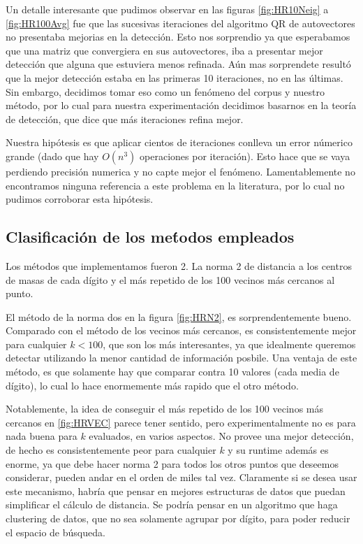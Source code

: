 Un detalle interesante que pudimos observar en las figuras \ref{fig:HR10Neig} a
\ref{fig:HR100Avg} fue que las sucesivas iteraciones del algoritmo QR de
autovectores no presentaba mejorias en la detecci\'on. Esto nos sorprendio
ya que esperabamos que una matriz que convergiera en sus autovectores,
iba a presentar mejor detecci\'on que alguna que estuviera menos refinada.
A\'un mas sorprendete result\'o que la mejor detecci\'on estaba en las primeras 10
iteraciones, no en las \'ultimas. Sin embargo, decidimos tomar eso como un fen\'omeno
del corpus y nuestro m\'etodo, por lo cual para nuestra experimentaci\'on decidimos
basarnos en la teor\'ia de detecci\'on, que dice que m\'as iteraciones refina mejor. 

Nuestra hip\'otesis es que aplicar cientos de iteraciones conlleva un error
n\'umerico grande (dado que hay $O(n^3)$ operaciones por iteraci\'on). Esto
hace que se vaya perdiendo precisi\'on numerica y no capte mejor el fen\'omeno.
Lamentablemente no encontramos ninguna referencia a este problema en la literatura,
por lo cual no pudimos corroborar esta hip\'otesis. 


\subsection{Clasificaci\'on de los me\'todos empleados}
Los m\'etodos que implementamos fueron 2. La norma 2 de distancia a
los centros de masas de cada d\'igito y el m\'as repetido de los 100 vecinos m\'as cercanos al punto.

El m\'etodo de la norma dos en la figura \ref{fig:HRN2}, es sorprendentemente bueno. Comparado con el m\'etodo de
los vecinos m\'as cercanos, es consistentemente mejor para cualquier $k<100$, que son los m\'as
interesantes, ya que idealmente queremos detectar utilizando la menor cantidad de informaci\'on posbile. Una ventaja
de este m\'etodo, es que solamente hay que comparar contra 10 valores (cada media de d\'igito), lo cual lo hace enormemente
m\'as rapido que el otro m\'etodo.

Notablemente, la idea de conseguir el m\'as repetido de los 100 vecinos m\'as cercanos en \ref{fig:HRVEC}
parece tener sentido, pero experimentalmente no es para nada buena para $k$ evaluados, en varios aspectos.
No provee una mejor detecci\'on, de hecho es consistentemente peor para cualquier $k$ y su runtime adem\'as es enorme,
ya que debe hacer norma 2 para todos los otros puntos que deseemos considerar, pueden andar en el orden de miles tal vez.
Claramente si se desea usar este mecanismo, habr\'ia que pensar en mejores estructuras
de datos que puedan simplificar el c\'alculo de distancia. Se podr\'ia pensar en un algoritmo
que haga clustering de datos, que no sea solamente agrupar por d\'igito, para poder reducir
el espacio de b\'usqueda.


